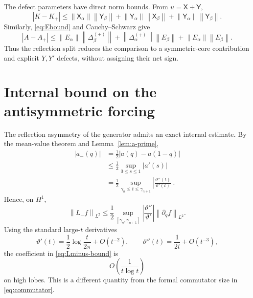 \documentclass[11pt]{amsart}
\numberwithin{equation}{section}
\theoremstyle{plain}
\theoremstyle{definition}
\theoremstyle{remark}
\newcommand{\norm}[1]{\left\lVert #1\right\rVert}
\begin{document}
The defect parameters have direct norm bounds.  From $u=\mathsf X+\mathsf Y$,
\begin{equation}
|K-K_+|
\le
\norm{\mathsf X_\alpha}\norm{\mathsf Y_\beta}
+\norm{\mathsf Y_\alpha}\norm{\mathsf X_\beta}
+\norm{\mathsf Y_\alpha}\norm{\mathsf Y_\beta}.
\label{eq:K-defect-bound}
\end{equation}
Similarly, \eqref{eq:Ebound} and Cauchy--Schwarz give
\begin{equation}
|A-A_+|
\le
\norm{E_\alpha}\norm{\Delta_\beta^{(+)}}
+\norm{\Delta_\alpha^{(+)}}\norm{E_\beta}
+\norm{E_\alpha}\norm{E_\beta}.
\label{eq:A-defect-bound}
\end{equation}
Thus the reflection split reduces the comparison to a symmetric-core contribution and explicit $Y,Y'$ defects, without assigning their net sign.

\section{Internal bound on the antisymmetric forcing}
\label{sec:aminus}

The reflection asymmetry of the generator admits an exact internal estimate.  By the mean-value theorem and Lemma~\ref{lem:a-prime},
\begin{equation}
\begin{aligned}
|a_-(q)|
&=\frac12|a(q)-a(1-q)|\\
&\le\frac12\sup_{0\le s\le1}|a'(s)|\\
&=\frac12\sup_{\gamma_n\le t\le\gamma_{n+1}}
\left|\frac{\vartheta''(t)}{\vartheta'(t)}\right|.
\end{aligned}
\label{eq:aminus-bound}
\end{equation}
Hence, on $H^1$,
\begin{equation}
\boxed{
\norm{L_-f}_{L^2}
\le
\frac12\sup_{[\gamma_n,\gamma_{n+1}]}
\left|\frac{\vartheta''}{\vartheta'}\right|
\norm{\partial_qf}_{L^2}.
}
\label{eq:Lminus-bound}
\end{equation}
Using the standard large-$t$ derivatives
\begin{equation}
\vartheta'(t)=\frac12\log\frac{t}{2\pi}+O(t^{-2}),
\qquad
\vartheta''(t)=\frac1{2t}+O(t^{-3}),
\end{equation}
the coefficient in \eqref{eq:Lminus-bound} is
\begin{equation}
O\!\left(\frac1{t\log t}\right)
\end{equation}
on high lobes.  This is a different quantity from the formal commutator size in \eqref{eq:commutator}.
\end{document}
